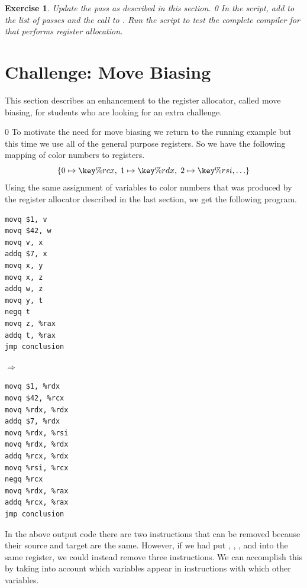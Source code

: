 \documentclass[7x10,nocrop]{TimesAPriori_MIT}%
\def\racketEd{0}
\def\edition{0}
\newcommand{\racket}[1]{{\if\edition\racketEd{#1}\fi}}
\newtheorem{exercise}[theorem]{Exercise}
\begin{document}
\begin{exercise}\normalfont\normalsize
Update the  pass as described in this section.
%
\racket{
In the  script, add \code{prelude\_and\_conclusion} to the
list of passes and the call to \code{compiler-tests}.}
%
Run the script to test the complete compiler for \LangVar{} that
performs register allocation.
\end{exercise}

\section{Challenge: Move Biasing}
\label{sec:move-biasing}

This section describes an enhancement to the register allocator,
called move biasing, for students who are looking for an extra
challenge.

{\if\edition\racketEd      
To motivate the need for move biasing we return to the running example
but this time we use all of the general purpose registers.  So we have
the following mapping of color numbers to registers.
\[
  \{ 0 \mapsto \key{\%rcx}, \; 1 \mapsto \key{\%rdx}, \; 2 \mapsto \key{\%rsi}, \ldots \}
\]
Using the same assignment of variables to color numbers that was
produced by the register allocator described in the last section, we
get the following program.
\begin{center}
\begin{minipage}{0.3\textwidth}
\begin{lstlisting}
movq $1, v
movq $42, w
movq v, x
addq $7, x
movq x, y
movq x, z
addq w, z
movq y, t
negq t
movq z, %rax
addq t, %rax
jmp conclusion
\end{lstlisting}
\end{minipage}
$\Rightarrow\qquad$
\begin{minipage}{0.45\textwidth}
\begin{lstlisting}
movq $1, %rdx
movq $42, %rcx
movq %rdx, %rdx
addq $7, %rdx
movq %rdx, %rsi
movq %rdx, %rdx
addq %rcx, %rdx
movq %rsi, %rcx
negq %rcx
movq %rdx, %rax
addq %rcx, %rax
jmp conclusion
\end{lstlisting}
\end{minipage}
\end{center}
In the above output code there are two  instructions that
can be removed because their source and target are the same.  However,
if we had put , , , and  into the same
register, we could instead remove three  instructions.  We
can accomplish this by taking into account which variables appear in
 instructions with which other variables.
\fi}
\end{document}
